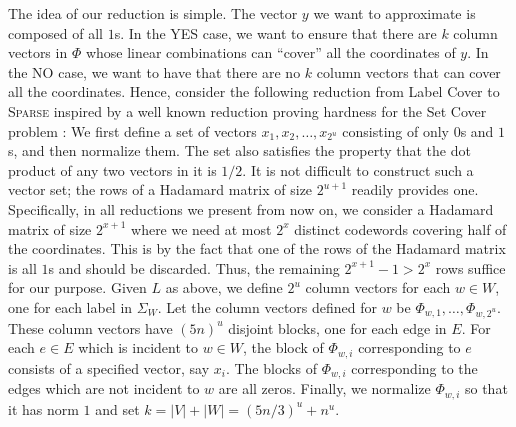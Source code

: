 \documentclass[11pt]{article}
\begin{document}
The idea of our reduction is simple. The vector $y$ we want
to approximate is composed of all $1$s. In the YES case,
we want to ensure that there are $k$ column vectors in $\Phi$
whose linear combinations can ``cover'' all the coordinates
of $y$. In the NO case, we want to have that there are no
$k$ column vectors that can cover all the coordinates.
Hence, consider the following reduction from Label Cover to
\textsc{Sparse} inspired by a well known reduction proving
hardness for the Set Cover problem \cite{Lund-Yannakakis}:
We first define a set of vectors $x_1, x_2, \hdots, x_{2^u}$
consisting of only $0$s and $1$s, and then normalize them.
The set also satisfies the property that the dot product
of any two vectors in it is $1/2$. It is not difficult to
construct such a vector set; the rows of a Hadamard matrix
of size $2^{u+1}$ readily provides one. Specifically, in all
reductions we present from now on, we consider a Hadamard matrix
of size $2^{x+1}$ where we need at most $2^x$ distinct codewords
covering half of the coordinates. This is by the fact that one
of the rows of the Hadamard matrix is all $1$s and should
be discarded. Thus, the remaining $2^{x+1}-1>2^x$ rows suffice
for our purpose. Given $L$ as above, we define $2^u$
column vectors for each $w \in W$, one for each label in
$\Sigma_W$. Let the column vectors defined for $w$ be $\Phi_{w,1},
\hdots, \Phi_{w,2^u}$. These column vectors have $(5n)^u$
disjoint blocks, one for each edge in $E$. For each
$e \in E$ which is incident to $w \in W$, the block of
$\Phi_{w,i}$ corresponding to $e$ consists of a specified
vector, say $x_i$. The blocks of $\Phi_{w,i}$ corresponding
to the edges which are not incident to $w$ are all zeros.
Finally, we normalize $\Phi_{w,i}$ so that it has norm
$1$ and set $k = |V|+|W| = (5n/3)^u+n^u$.
\end{document}
